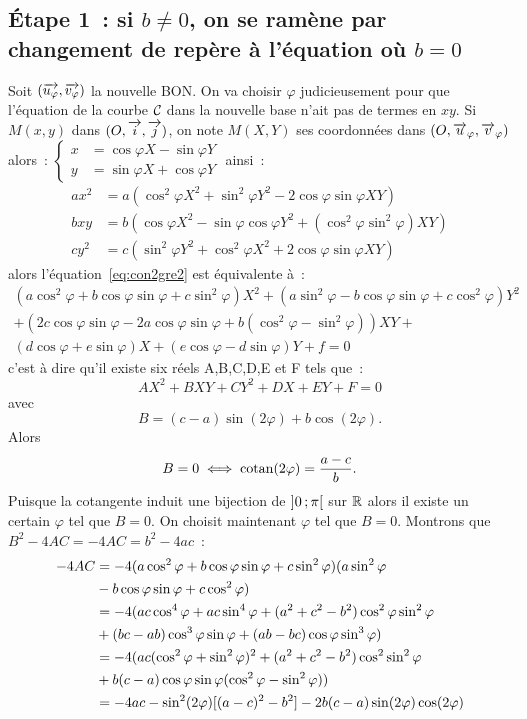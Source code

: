 \subsection{Étape 1~: si $b\neq 0$, on se ramène par changement de repère à l'équation où $b=0$}
Soit $(\overrightarrow{u_{\varphi}},\overrightarrow{v_{\varphi}})$ la nouvelle BON\@. On va choisir $\varphi$ judicieusement pour que l'équation de la courbe $\mathcal{C}_{{}}$ dans la nouvelle base n'ait pas de termes en $xy$. Si $M(x,y)$ dans $(O,\overrightarrow{i},\overrightarrow{j})$, on note $M(X,Y)$ ses coordonnées dans $(O,\overrightarrow{u}_\varphi,\overrightarrow{v}_\varphi)$ alors~:
$\begin{cases} x&=\cos\varphi X - \sin\varphi Y \\ y&=\sin\varphi X + \cos\varphi Y\end{cases}$ ainsi~:
\begin{align}
  ax^2&=a(\cos^2\varphi X^2 + \sin^2\varphi Y^2 - 2\cos\varphi\sin\varphi XY)\\
  bxy&=b(\cos\varphi X^2 -\sin\varphi\cos\varphi Y^2 + (\cos^2\varphi \sin^2\varphi)XY)\\
  cy^2&=c(\sin^2\varphi Y^2 + \cos^2\varphi X^2 + 2\cos\varphi\sin\varphi XY)
\end{align}
alors l'équation~\eqref{eq:con2gre2} est équivalente à~:
\begin{multline}
 (a\cos^2\varphi + b\cos\varphi\sin\varphi +c\sin^2\varphi)X^2+(a\sin^2\varphi - b\cos\varphi\sin\varphi +c\cos^2\varphi)Y^2\\+(2c\cos\varphi\sin\varphi-2a\cos\varphi\sin\varphi+b(\cos^2\varphi - \sin^2\varphi))XY + \\ (d\cos\varphi + e\sin\varphi)X +(e\cos\varphi - d\sin\varphi)Y +f=0
\end{multline}
c'est à dire qu'il existe six réels A,B,C,D,E et F tels que~:
\begin{equation}
  AX^2+BXY+CY^2+DX+EY+F=0 \label{eq:eqz}
\end{equation}
avec
\begin{equation}
 B=(c-a)\sin(2\varphi)+b\cos(2\varphi).
\end{equation}
Alors
\begin{equation}
 B=0 \iff \operatorname{cotan}(2\varphi)=\frac{a-c}{b}.
\end{equation}
Puisque la cotangente induit une bijection de $\left] 0 \, ;  \pi \right[$ sur $\mathbb{R}$ alors il existe un certain $\varphi$ tel que $B=0$. On choisit maintenant $\varphi$ tel que $B=0$. Montrons que $B^2-4AC=-4AC=b^2-4ac$~:
\begin{align}
  -4AC&=-4(a\cos^2\varphi+b\cos\varphi\sin\varphi +c\sin^2\varphi)(a\sin^2\varphi \\ &- b\cos\varphi\sin\varphi +c\cos^2\varphi) \notag\\
  &=-4(ac\cos^4\varphi + ac\sin^4\varphi+(a^2+c^2-b^2)\cos^2\varphi\sin^2\varphi\\ & +(bc-ab)\cos^3\varphi\sin\varphi+(ab-bc)\cos\varphi\sin^3\varphi) \notag\\
  &=-4(ac(\cos^2\varphi+\sin^2\varphi)^2+(a^2+c^2-b^2)\cos^2\sin^2\varphi \\ & +b(c-a)\cos\varphi\sin\varphi(\cos^2\varphi-\sin^2\varphi)) \notag\\
  &=-4ac-\sin^2(2\varphi)[(a-c)^2-b^2]-2b(c-a)\sin(2\varphi)\cos(2\varphi)
\end{align}
